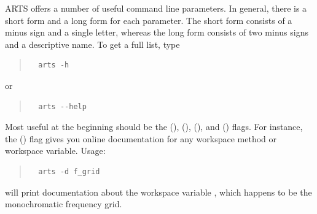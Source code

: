 ARTS offers a number of useful command line parameters. In general,
there is a short form and a long form for each parameter. The short
form consists of a minus sign and a single letter, whereas the long
form consists of two minus signs and a descriptive name. To get a full
list, type
\begin{quote}
\begin{verbatim}
  arts -h
\end{verbatim}
\end{quote}
or
\begin{quote}
\begin{verbatim}
  arts --help
\end{verbatim}
\end{quote}
Most useful at the beginning should be the 
(),  (), 
(), and  () flags.
For instance, the  () flag gives you online
documentation for any workspace method or workspace variable. Usage:
\begin{quote}
\begin{verbatim}
  arts -d f_grid
\end{verbatim}
\end{quote}
will print documentation about the workspace variable , which
happens to be the monochromatic frequency grid.

